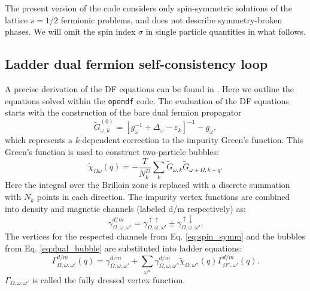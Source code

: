 \documentclass[3p,times,procedia]{elsarticle}
\begin{document}
The present version of the code considers only spin-symmetric solutions of the lattice $s=1/2$ fermionic problems, and does not describe symmetry-broken phases. We will omit the spin index $\sigma$ in single particle quantities in what follows.


\subsection{Ladder dual fermion self-consistency loop}
A precise derivation of the DF equations can be found in \cite{Hafermann2012, Antipov2014}. Here we outline the equations solved within the \texttt{opendf} code. The evaluation of the DF equations  starts with the construction of the bare dual fermion propagator
\begin{equation}
\tilde G^{(0)}_{\omega,k} = \left[g_{\omega}^{-1} + \Delta_\omega - \varepsilon_k\right]^{-1} - g_{\omega}, \label{eq:gd0}
\end{equation}
which represents a $k$-dependent correction to the impurity Green's function. This Green's function is used to construct two-particle bubbles: 
\begin{equation}\label{eq:dual_bubble}
\tilde \chi_{\Omega\omega}(q) = -\frac{T}{N_k^D} \sum_k \tilde G_{\omega, k} \tilde G_{\omega + \Omega, k+q}.
\end{equation}
Here the integral over the Brilloin zone is replaced with a discrete summation with $N_k$ points in each direction. The impurity vertex functions are combined into density and magnetic channels (labeled d/m respectively) as: 
\begin{equation}\label{eq:spin_symm}
\gamma^{d/m}_{\Omega,\omega,\omega'} = \gamma^{\uparrow\uparrow}_{\Omega,\omega,\omega'} \pm \gamma^{\uparrow\downarrow}_{\Omega,\omega,\omega'}.
\end{equation}
The vertices for the respected channels from Eq. \ref{eq:spin_symm} and the bubbles from Eq. \ref{eq:dual_bubble} are substituted into ladder equations:
\begin{equation}\label{eq:dual_ladder}
\Gamma^{d/m}_{\Omega,\omega,\omega'}(q) = \gamma^{d/m}_{\Omega,\omega,\omega'} + \sum_{\omega''} \gamma^{d/m}_{\Omega,\omega,\omega''} \tilde\chi_{\Omega,\omega''}(q) \Gamma^{d/m}_{\Omega'',\omega'}(q).
\end{equation}
 $\Gamma_{\Omega,\omega,\omega'}$ is called the fully dressed vertex function.
\end{document}
